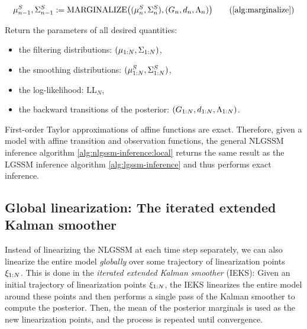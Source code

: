 \documentclass{mimosis}
\begin{document}
\begin{alg}
\begin{enumerate}[nosep]
\begin{itemize}
\begin{fleqn}
\begin{equation}
  \mean{{\idxt-1}}^S, \cov{{\idxt-1}}^S := \operatorname{MARGINALIZE}\left(
    (\mean{\idxt}^S, \cov{\idxt}^S),
    (\invtransA_\idxt, \invtransb_\idxt, \invtransC_\idxt)
  \right)
  \tag{\cref{alg:marginalize}}
\end{equation}
\end{fleqn}
\end{itemize}
\end{enumerate}
Return the parameters of all desired quantities:
\begin{itemize}[nosep]
\item the filtering distributions: \((\mu_{{1:N}}, \Sigma_{{1:N}})\),
\item the smoothing distributions: \((\mu_{{1:N}}^S, \Sigma_{{1:N}}^S)\),
\item the log-likelihood: \(\text{LL}_N\),
\item the backward transitions of the posterior: \((G_{1:N}, d_{1:N}, \Lambda_{1:N})\).
\end{itemize}
\end{alg}
\begin{remark}
First-order Taylor approximations of affine functions are exact.
Therefore, given a model with affine transition and observation functions, the general NLGSSM inference algorithm \ref{alg:nlgssm-inference:local} returns the same result as the LGSSM inference algorithm \ref{alg:lgssm-inference} and thus performs exact inference.
\end{remark}
\subsection{Global linearization: The iterated extended Kalman smoother}
\label{sec:org80e6674}
\label{sec:iterated-linearization}
\label{sec:nlgssm-inference:global}

Instead of linearizing the NLGSSM at each time step separately, we can also linearize the entire model \emph{globally} over some trajectory of linearization points \(\xi_{1:N}\).
This is done in the \emph{iterated extended Kalman smoother} (IEKS):
Given an initial trajectory of linearization points \(\xi_{1:N}\),
the IEKS linearizes the entire model around these points and then performs a single pass of the Kalman smoother to compute the posterior.
Then, the mean of the posterior marginals is used as the new linearization points, and the process is repeated until convergence.
\end{document}
